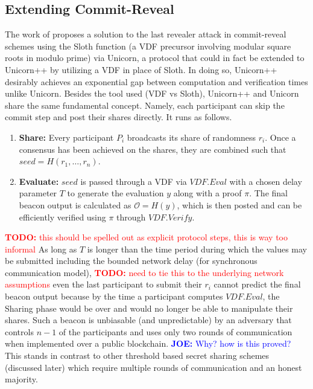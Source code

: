 \documentclass[letterpaper,twocolumn,10pt]{article}
\theoremstyle{definition}
\theoremstyle{remark}
\newcommand{\todo}[1]{\textcolor{red}{\textbf{TODO:} #1}}
\newcommand{\joenote}[1]{\textcolor{blue}{\textbf{JOE:} #1}}
\begin{document}
\subsection{Extending Commit-Reveal}
The work of \cite{lenstra2015random} proposes a solution to the last revealer attack in commit-reveal schemes using the Sloth function (a VDF precursor involving modular square roots in modulo prime) via Unicorn, a protocol that could in fact be extended to Unicorn++ by utilizing a VDF in place of Sloth. In doing so, Unicorn++ desirably achieves an exponential gap between computation and verification times unlike Unicorn. Besides the tool used (VDF vs Sloth), Unicorn++ and Unicorn share the same fundamental concept. Namely, each participant can skip the commit step and post their shares directly. It runs as follows.
\begin{enumerate}
    \item \textbf{Share:} Every participant $P_i$ broadcasts its share of randomness $r_i$. Once a consensus has been achieved on the shares, they are combined such that  $seed = H(r_1,\ldots, r_n)$.
    \item \textbf{Evaluate:} $seed$ is passed through a VDF via $VDF.Eval$ with a chosen delay parameter $T$ to generate the evaluation $y$ along with a proof $\pi$. The final beacon output is calculated as $\mathcal{O} = H(y) $, which is then posted and can be efficiently verified using $\pi$ through $VDF.Verify$.
\end{enumerate}
\todo{this should be spelled out as explicit protocol steps, this is way too informal} 
As long as $T$ is longer than the time period during which the values may be submitted including the bounded network delay (for synchronous communication model), \todo{need to tie this to the underlying network assumptions} even the last participant to submit their $r_i$ cannot predict the final beacon output because by the time a participant computes $VDF.Eval$, the Sharing phase would be over and would no longer be able to manipulate their shares. Such a beacon is unbiasable (and unpredictable) by an adversary that controls $n-1$ of the participants and uses only two rounds of communication when implemented over a public blockchain. \joenote{Why? how is this proved?} This stands in contrast to other threshold based secret sharing schemes (discussed later) which require multiple rounds of communication and an honest majority.
\end{document}
